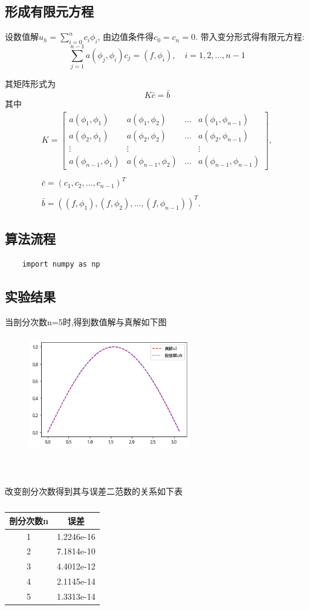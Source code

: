 \documentclass[UTF8,titlepage,twocolumn]{ctexart}
\begin{document}
\subsection{形成有限元方程}

设数值解$u_h = \sum_{i=0}^n c_i \phi_i $, 由边值条件得$c_0 = c_n = 0$.
带入变分形式得有限元方程:
$$
\sum_{j=1}^{n-1} a(\phi_j, \phi_i) c_j = (f, \phi_i), \quad i = 1, 2, ... , n-1
$$
\par 
其矩阵形式为
$$ K \bar{c} = \bar{b} $$
其中
$$
\begin{matrix}
K = \begin{bmatrix}
		a(\phi_1,\phi_1) & a(\phi_1,\phi_2) & ... & a(\phi_1,\phi_{n-1}) \\
		a(\phi_2,\phi_1) & a(\phi_2,\phi_2) & ... & a(\phi_2,\phi_{n-1}) \\
		\vdots           & \vdots           &     & \vdots  			 \\
		a(\phi_{n-1},\phi_1) & a(\phi_{n-1},\phi_2) & ... & a(\phi_{n-1},\phi_{n-1})
	\end{bmatrix}, \\ \\
\bar{c} = (c_1, c_2, ... , c_{n-1})^T \\ \\
\bar{b} = ((f,\phi_1), (f,\phi_2), ... , (f,\phi_{n-1}))^T.
\end{matrix}
$$

\subsection{算法流程}

\begin{lstlisting}
	import numpy as np
\end{lstlisting}

\subsection{实验结果}

当剖分次数n=5时,得到数值解与真解如下图
\begin{figure}[hb]
	\centering
	\includegraphics[height=5cm,width=7cm]{../image/Poisson1d.png}
	\caption{}
	\label{SampleOfDatasets}
\end{figure}
\\ \\ 
改变剖分次数得到其与误差二范数的关系如下表

\begin{table}[!ht]
	\centering
	\caption{}%
	\begin{tabular}{|c|c|} \hline
		剖分次数n & 误差 \\ \hline
		1 & 1.2246e-16 \\ \hline
		2 & 7.1814e-10 \\ \hline
		3 & 4.4012e-12 \\ \hline
		4 & 2.1145e-14 \\ \hline
		5 & 1.3313e-14 \\ \hline
	\end{tabular}
\end{table}
\end{document}
